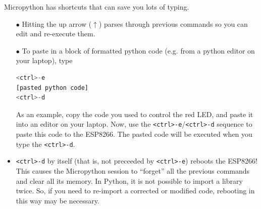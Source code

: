 %



	\begin{kaobox}[frametitle=Some MicroPython shortcuts...] \label{copy_paste}
	Micropython has shortcuts that can save you lots of typing. 
	\begin{itemize}
	\item[$\bullet$] Hitting the up arrow ($\uparrow$) parses through previous commands so you can edit and re-execute them.
	\item[$\bullet$] To paste in a block of formatted python code (e.g. from a python editor on your laptop), type 
\begin{lstlisting}[language=Python]
<ctrl>-e
[pasted python code]
<ctrl>-d
\end{lstlisting}
	As an example, copy the code you used to control the red LED, and paste it into an editor on your laptop. 
	Now, use the \texttt{<ctrl>-e}/\texttt{<ctrl>-d} sequence to paste this code to the ESP8266. 
	The pasted code will be executed when you type the \texttt{<ctrl>-d}.

	\item  \texttt{<ctrl>-d} by itself (that is, not preceeded by \texttt{<ctrl>-e}) reboots the ESP8266! 
	This causes the Micropython session to “forget” all the previous commands and clear all its memory. 
	In Python, it is not possible to import a library twice. 
	So, if you need to re-import a corrected or modified code, rebooting in this way may be necessary. 
	\end{itemize}
	\end{kaobox}

